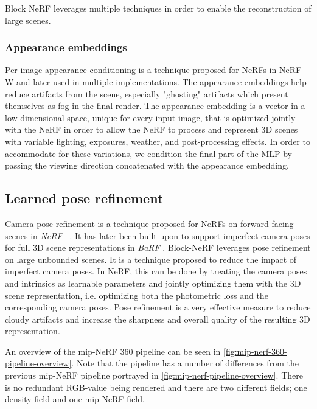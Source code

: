 Block NeRF leverages multiple techniques in order to enable the reconstruction of large scenes.

\subsubsection{Appearance embeddings} \label{sec:appearance-embeddings}
Per image appearance conditioning is a technique proposed for NeRFs in NeRF-W \cite{martin-brualla_nerf_2021} and later used in multiple implementations. The appearance embeddings help reduce artifacts from the scene, especially "ghosting" artifacts which present themselves as fog in the final render. The appearance embedding is a vector in a low-dimensional space, unique for every input image, that is optimized jointly with the NeRF in order to allow the NeRF to process and represent 3D scenes with variable lighting, exposures, weather, and post-processing effects. In order to accommodate for these variations, we condition the final part of the MLP by passing the viewing direction concatenated with the appearance embedding. 

\subsection{Learned pose refinement} \label{sec:camera-pose-refinement}
Camera pose refinement is a technique proposed for NeRFs on forward-facing scenes in \textit{NeRF--} \cite{wang_nerf--_2022}. It has later been built upon to support imperfect camera poses for full 3D scene representations in \textit{BaRF} \cite{lin_barf_2021}. Block-NeRF leverages pose refinement on large unbounded scenes. It is a technique proposed to reduce the impact of imperfect camera poses. In NeRF, this can be done by treating the camera poses and intrinsics as learnable parameters and jointly optimizing them with the 3D scene representation, i.e. optimizing both the photometric loss and the corresponding camera poses. Pose refinement is a very effective measure to reduce cloudy artifacts and increase the sharpness and overall quality of the resulting 3D representation.

An overview of the mip-NeRF 360 pipeline can be seen in \autoref{fig:mip-nerf-360-pipeline-overview}. Note that the pipeline has a number of differences from the previous mip-NeRF pipeline portrayed in \autoref{fig:mip-nerf-pipeline-overview}. There is no redundant RGB-value being rendered and there are two different fields; one density field and one mip-NeRF field.

